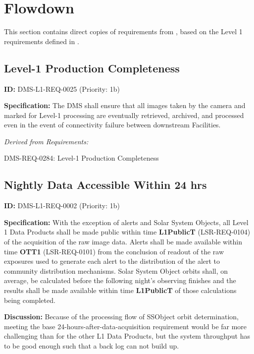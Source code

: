 \documentclass[SE,toc,lsstdraft]{lsstdoc}
\date{2018-01-16}
\begin{document}
\maketitle

\section{ Flowdown}

This section contains direct copies of requirements from , based on the Level 1 requirements defined in .

\subsection{Level-1 Production Completeness}

\label{DMS-L1-REQ-0025}
\textbf{ID:} DMS-L1-REQ-0025 (Priority: 1b)

\textbf{Specification:} The DMS shall ensure that all images taken by the camera and marked for Level-1 processing are eventually retrieved, archived, and processed even in the event of connectivity failure between downstream Facilities.

\emph{Derived from Requirements:}

DMS-REQ-0284:
Level-1 Production Completeness \newline

\subsection{Nightly Data Accessible Within 24 hrs}

\label{DMS-L1-REQ-0002}
\textbf{ID:} DMS-L1-REQ-0002 (Priority: 1b)

\textbf{Specification:} With the exception of alerts and Solar System Objects, all Level 1 Data Products shall be made public within time \textbf{L1PublicT} (LSR-REQ-0104) of the acquisition of the raw image data. Alerts shall be made available within time \textbf{OTT1} (LSR-REQ-0101) from the conclusion of readout of the raw exposures used to generate each alert to the distribution of the alert to community distribution mechanisms.  Solar System Object orbits shall, on average, be calculated before the following night's observing finishes and the results shall be made available within time \textbf{L1PublicT} of those calculations being completed.

\textbf{Discussion:} Because of the processing flow of SSObject orbit determination, meeting the base 24-hours-after-data-acquisition requirement would be far more challenging than for the other L1 Data Products, but the system throughput has to be good enough such that a back log can not build up.
\end{document}
